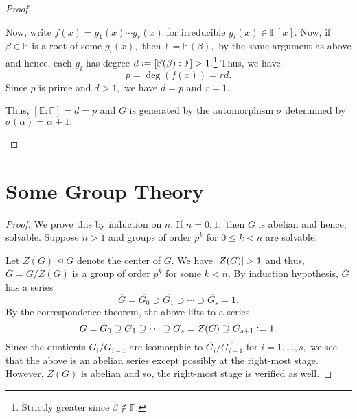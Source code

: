 \begin{proof}
\begin{enumerate}[leftmargin=*]
        Now, write $f(x) = g_1(x) \cdots g_r(x)$ for irreducible $g_i(x) \in \mathbb{F}[x].$ Now, if $\beta \in \mathbb{E}$ is a root of some $g_i(x),$ then $\mathbb{E} = \mathbb{F}(\beta),$ by the same argument as above and hence, each $g_i$ has degree $d \vcentcolon= [\mathbb{F}(\beta) : \mathbb{F}] > 1.$\footnote{Strictly greater since $\beta \notin \mathbb{F}.$} Thus, we have
        \begin{equation*} 
            p = \deg(f(x)) = rd.
        \end{equation*}
        Since $p$ is prime and $d > 1,$ we have $d = p$ and $r = 1.$

        Thus, $[\mathbb{E} : \mathbb{F}] = d = p$ and $G$ is generated by the automorphism $\sigma$ determined by $\sigma(\alpha) = \alpha + 1.$ \qedhere
    \end{enumerate}
\end{proof}

\section{Some Group Theory}

\pgroupssolvable*\label{prop:pgroupssolvable2}
\begin{flushright}\hyperref[prop:pgroupssolvable]{\upsym}\end{flushright}
\begin{proof}
    We prove this by induction on $n.$ If $n = 0, 1,$ then $G$ is abelian and hence, solvable. Suppose $n > 1$ and groups of order $p^{k}$ for $0 \le k < n$ are solvable.

    Let $Z(G) \unlhd G$ denote the center of $G.$ We have $\md{Z(G)} > 1$ and thus, $\overline{G} = G/Z(G)$ is a group of order $p^k$ for some $k < n.$ By induction hypothesis, $\overline{G}$ has a series
    \begin{equation*} 
        \overline{G} = \overline{G_0} \supset \overline{G_1} \supset \cdots \supset \overline{G_{s}} = 1.
    \end{equation*}
    By the correspondence theorem, the above lifts to a series
    \begin{equation*} 
        G = G_0 \supset G_1 \supset \cdots \supset G_{s} = Z(G) \supset G_{s + 1} \vcentcolon= 1.
    \end{equation*}
    Since the quotients $G_i/G_{i - 1}$ are isomorphic to $\overline{G_i}/\overline{G_{i - 1}}$ for $i = 1, \ldots, s,$ we see that the above is an abelian series except possibly at the right-most stage. However, $Z(G)$ is abelian and so, the right-most stage is verified as well.
\end{proof}

